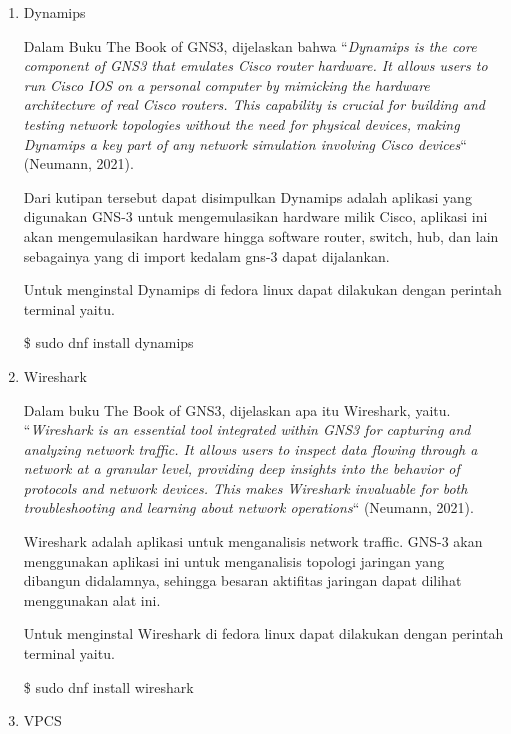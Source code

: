 \documentclass[12pt, a4paper]{article}
\begin{document}
      \begin{enumerate}[label=\arabic*.]
        \item Dynamips

          Dalam Buku The Book of GNS3, dijelaskan bahwa ``\emph{Dynamips is the
          core component of GNS3 that emulates Cisco router hardware.
          It allows users to run Cisco IOS on a personal computer by mimicking
          the hardware architecture of real Cisco routers. This capability
          is crucial for building and testing network topologies without the
          need for physical devices, making Dynamips a key part of any network
          simulation involving Cisco devices}`` (Neumann, 2021).

          Dari kutipan tersebut dapat disimpulkan Dynamips adalah aplikasi yang
          digunakan GNS-3 untuk mengemulasikan hardware milik Cisco,
          aplikasi ini akan mengemulasikan hardware 
          hingga software router, switch, hub, dan lain sebagainya yang di
          import kedalam gns-3 dapat dijalankan.

          Untuk menginstal Dynamips di fedora linux dapat dilakukan dengan
          perintah terminal yaitu.

          \$ sudo dnf install dynamips

        \item Wireshark

          Dalam buku The Book of GNS3, dijelaskan apa itu Wireshark, yaitu.
          ``\emph{Wireshark is an essential tool integrated within GNS3 for capturing
          and analyzing network traffic. It allows users to inspect
          data flowing through a network at a granular level, providing
          deep insights into the behavior of protocols and network devices.
          This makes Wireshark invaluable for both troubleshooting and learning
          about network operations}`` (Neumann, 2021).

          Wireshark adalah aplikasi untuk menganalisis network traffic.
          GNS-3 akan menggunakan aplikasi ini untuk menganalisis topologi 
          jaringan yang dibangun didalamnya, sehingga besaran aktifitas
          jaringan dapat dilihat menggunakan alat ini.

          Untuk menginstal Wireshark di fedora linux dapat dilakukan dengan
          perintah terminal yaitu.

          \$ sudo dnf install wireshark

        \item VPCS


\end{enumerate}
\end{document}
